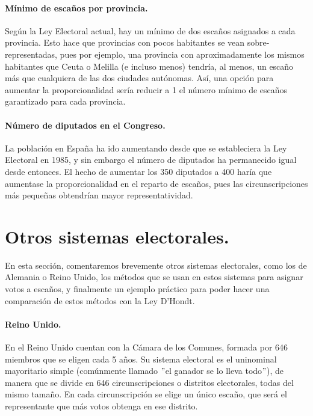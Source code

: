 \documentclass[11pt]{article}
\begin{document}
	\paragraph{Mínimo de escaños por provincia.}
	
	Según la Ley Electoral actual, hay un mínimo de dos escaños asignados a cada provincia. Esto hace que provincias con pocos habitantes se vean sobre-representadas, pues por ejemplo, una provincia con aproximadamente los mismos habitantes que Ceuta o Melilla (e incluso menos) tendría, al menos, un escaño más que cualquiera de las dos ciudades autónomas. Así, una opción para aumentar la proporcionalidad sería reducir a 1 el número mínimo de escaños garantizado para cada provincia.
	
	\paragraph{Número de diputados en el Congreso.}
	
	La población en España ha ido aumentando desde que se estableciera la Ley Electoral en 1985, y sin embargo el número de diputados ha permanecido igual desde entonces. El hecho de aumentar los 350 diputados a 400 haría que aumentase la proporcionalidad en el reparto de escaños, pues las circunscripciones más pequeñas obtendrían mayor representatividad.
	
	\newpage
	

	
	\section{Otros sistemas electorales.}
	
	En esta sección, comentaremos brevemente otros sistemas electorales, como los de Alemania o Reino Unido, los métodos que se usan en estos sistemas para asignar votos a escaños, y finalmente un ejemplo práctico para poder hacer una comparación de estos métodos con la Ley D'Hondt.
	
\paragraph{Reino Unido.}

En el Reino Unido cuentan con la Cámara de los Comunes, formada por 646 miembros que se eligen cada 5 años. Su sistema electoral es el uninominal mayoritario simple (comúnmente llamado $"$el ganador se lo lleva todo$"$), de manera que se divide en 646 circunscripciones o distritos electorales, todas del mismo tamaño. En cada circunscripción se elige un único escaño, que será el representante que más votos obtenga en ese distrito.\\
\end{document}
